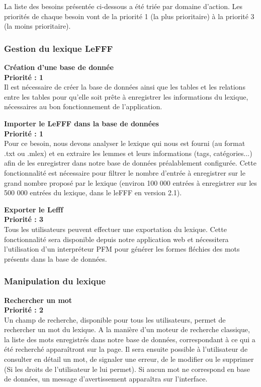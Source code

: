 \documentclass[12pt,a4paper]{article}
\begin{document}
    La liste des besoins présentée ci-dessous a été triée par domaine d'action. Les priorités de chaque besoin vont de la priorité 1 (la plus prioritaire) à la priorité 3 (la moins prioritaire).

    \subsubsection{Gestion du lexique LeFFF}

    \textbf{Création d'une base de donnée} \\
    \textbf{Priorité : 1} \\
    Il est nécessaire de créer la base de données ainsi que les tables et les relations entre les tables pour qu'elle soit prête à enregistrer les informations du lexique, nécessaires au bon fonctionnement de l'application.

    \textbf{Importer le LeFFF dans la base de données} \\
    \textbf{Priorité : 1} \\
    Pour ce besoin, nous devons analyser le lexique qui nous est fourni (au format .txt ou .mlex) et en extraire les lemmes et leurs informations (tags, catégories...) afin de les enregistrer dans notre base de données préalablement configurée.
    Cette fonctionnalité est nécessaire pour filtrer le nombre d'entrée à enregistrer sur le grand nombre proposé par le lexique (environ 100 000 entrées à enregistrer sur les 500 000 entrées du lexique, dans le leFFF en version 2.1).

    \textbf{Exporter le Lefff} \\
    \textbf{Priorité : 3}  \\
    Tous les utilisateurs peuvent effectuer une exportation du lexique.
    Cette fonctionnalité sera disponible depuis notre application web et nécessitera l'utilisation d'un interpréteur PFM pour générer les formes fléchies des mots présents dans la base de données.

    \subsubsection{Manipulation du lexique}

    \textbf{Rechercher un mot} \\
    \textbf{Priorité : 2} \\
    Un champ de recherche, disponible pour tous les utilisateurs, permet de rechercher un mot du lexique. A la manière d'un moteur de recherche classique, la liste des mots enregistrés dans notre base de données, correspondant à ce qui a été recherché apparaîtront sur la page. Il sera ensuite possible à l'utilisateur de consulter en détail un mot, de signaler une erreur, de le modifier ou le supprimer (Si les droits de l'utilisateur le lui permet). Si aucun mot ne correspond en base de données, un message d'avertissement apparaîtra sur l'interface.
\end{document}
